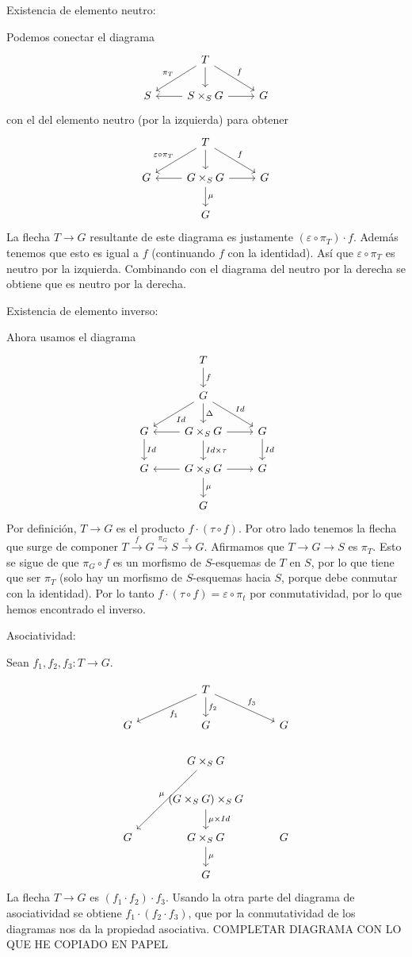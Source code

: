 \documentclass[GA.tex]{subfiles}
\begin{document}
\begin{dem}
Existencia de elemento neutro: 

Podemos conectar el diagrama
\[
\begin{tikzcd}
 & T\arrow[dl, "\pi_T"']\arrow[dr, "f"]\arrow[d] & \\
 S & S\times_S G\arrow[r] \arrow[l] & G
\end{tikzcd}
\]
con el del elemento neutro (por la izquierda) para obtener
\[
\begin{tikzcd}
 & T\arrow[dl, "\varepsilon\circ\pi_T"']\arrow[dr, "f"] \arrow[d]& \\
G & \arrow[l]\arrow[r]\arrow[d, "\mu"]G\times_S G & G\\
& G &  
\end{tikzcd}
\] 
La flecha $T\to G$ resultante de este diagrama es justamente $(\varepsilon\circ\pi_T)\cdot f$. Además tenemos que esto es igual a $f$ (continuando $f$ con la identidad). Así que $\varepsilon\circ\pi_T$ es neutro por la izquierda. Combinando con el diagrama del neutro por la derecha se obtiene que es neutro por la derecha. 

Existencia de elemento inverso:

Ahora usamos el diagrama
\[
\begin{tikzcd}
& T\arrow[d, "f"] &\\
& G\arrow[dl, "Id"]\arrow[dr, "Id"] \arrow[d, "\Delta"]& \\
G\arrow[d, "Id"] & \arrow[l]\arrow[r]G\times_S G\arrow[d, "Id\times\tau"]& G\arrow[d, "Id"]\\
G & \arrow[l]\arrow[r]G\times_S G\arrow[d,"\mu"]& G\\
& G &
\end{tikzcd}
\]
Por definición, $T\to G$ es el producto $f\cdot (\tau\circ f)$. Por otro lado tenemos la flecha que surge de componer $T\xrightarrow{f}G\xrightarrow{\pi_G}S\xrightarrow{\varepsilon}G$.  Afirmamos que $T\to G\to S$ es $\pi_T$. Esto se sigue de que $\pi_G\circ f$ es un morfismo de $S$-esquemas de $T$ en $S$, por lo que tiene que ser $\pi_T$ (solo hay un morfismo de $S$-esquemas hacia $S$, porque debe conmutar con la identidad). Por lo tanto $f\cdot (\tau\circ f)=\varepsilon\circ\pi_t$ por conmutatividad, por lo que hemos encontrado el inverso. 

Asociatividad:

Sean $f_1,f_2,f_3:T\to G$. 

\[
\begin{tikzcd}
& T\arrow[dl, "f_1"]\arrow[d, "f_2"]\arrow[dr, "f_3"] & \\
G & G & G\\
 & G\times_S G\arrow[ddl, "\mu"']&\\
& (G\times_S G)\times_S G\arrow[d, "\mu\times Id"]  & \\
G & G\times_S G \arrow[d, "\mu"] & G\\
& G &
\end{tikzcd}
\]
La flecha $T\to G$ es $(f_1\cdot f_2)\cdot f_3$. Usando la otra parte del diagrama de asociatividad se obtiene $f_1\cdot (f_2\cdot f_3)$, que por la conmutatividad de los diagramas nos da la propiedad asociativa. COMPLETAR DIAGRAMA CON LO QUE HE COPIADO EN PAPEL


\end{dem}
\end{document}
